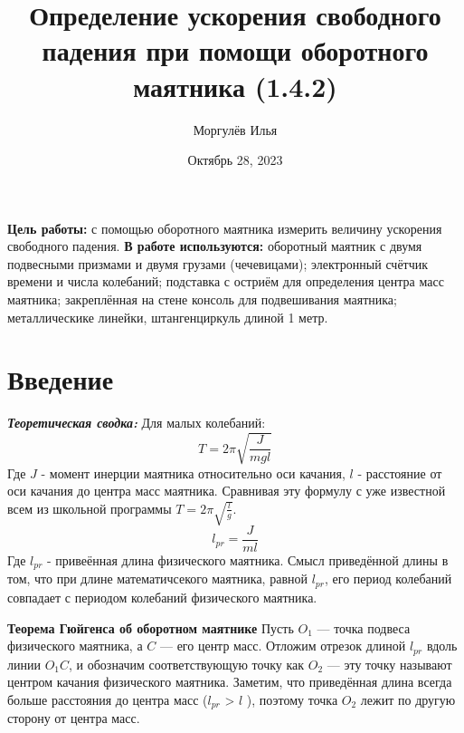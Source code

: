 \documentclass[a4paper, 12pt]{article}
\title{\textbf{Определение ускорения свободного падения при помощи оборотного маятника (1.4.2)}}
\author{Моргулёв Илья}
\date{Октябрь 28, 2023}
\begin{document}
\maketitle

\RaggedRight\textbf{Цель работы:} с помощью оборотного маятника измерить величину ускорения свободного падения. \newline
\textbf{В работе используются:} оборотный маятник с двумя подвесными призмами и двумя грузами (чечевицами); электронный счётчик времени и числа колебаний; подставка с остриём для определения центра масс маятника; закреплённая на стене консоль для подвешивания маятника; металлическике линейки, штангенциркуль длиной 1 метр.

\section{Введение}
\textbf{\textit{Теоретическая сводка:}}\newline
Для малых колебаний: \newline
\begin{equation}
\label{1}
T = 2 \pi \sqrt{\frac{J}{mgl}}
\end{equation}
Где $J$ - момент инерции маятника относительно оси качания, $l$ - расстояние от оси качания до центра масс маятника. \newline
Сравнивая эту формулу с уже известной всем из школьной программы $T = 2 \pi \sqrt{\frac{l}{g}}$. \newline
\begin{equation}
\label{2}
    l_{pr} = \frac{J}{ml}
\end{equation}
Где $l_{pr}$ - привеённая длина физического маятника. \newline
Смысл приведённой длины в том, что при длине математичсекого маятника, равной $l_{pr}$, его период колебаний совпадает с периодом колебаний физического маятника. \newline

\RaggedRight\textbf{Теорема Гюйгенса об оборотном маятнике} \newline
Пусть $\textit{O}_1$ — точка подвеса физического маятника, а $C$ — его центр масс. Отложим отрезок длиной $l_{pr}$ вдоль линии $\textit{O}_{1} \textit{C} $, и обозначим соответствующую точку как $\textit{O}_2$ — эту точку называют центром качания физического маятника. Заметим, что приведённая длина всегда больше расстояния до центра масс ($\textit{l}_{pr}$ > $\textit{l}$ ), поэтому точка $\textit{O}_2 $ лежит по другую сторону от центра масс. \newline
\end{document}
